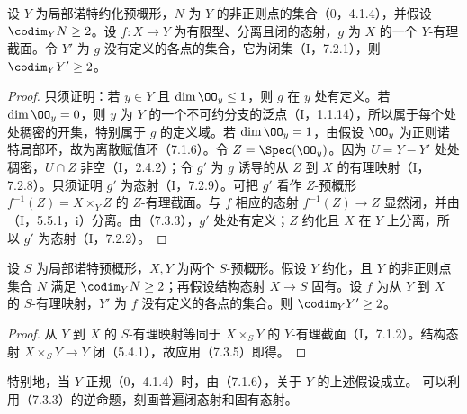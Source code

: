设 $Y$ 为局部诺特约化预概形，$N$ 为 $Y$ 的非正则点的集合（0，4.1.4），并假设 $\codim_YN\geq2$。设 $f:X\to Y$ 为有限型、分离且闭的态射，$g$ 为 $X$ 的一个 $Y$-有理截面。令 $Y'$ 为 $g$ 没有定义的各点的集合，它为闭集（I，7.2.1），则 $\codim_YY'\geq2$。
\begin{proof}
只须证明：若 $y\in Y$ 且 $\dim\OO_y\leq1$，则 $g$ 在 $y$ 处有定义。若 $\dim\OO_y=0$，则 $y$ 为 $Y$ 的一个不可约分支的泛点（I，1.1.14），所以属于每个处处稠密的开集，特别属于 $g$ 的定义域。若 $\dim\OO_y=1$，由假设 $\OO_y$ 为正则诺特局部环，故为离散赋值环（7.1.6）。令 $Z=\Spec(\OO_y)$。因为 $U=Y-Y'$ 处处稠密，$U\cap Z$ 非空（I，2.4.2）；令 $g'$ 为 $g$ 诱导的从 $Z$ 到 $X$ 的有理映射（I，7.2.8）。只须证明 $g'$ 为态射（I，7.2.9）。可把 $g'$ 看作 $Z$-预概形 $f^{-1}(Z)=X\times_Y Z$ 的 $Z$-有理截面。与 $f$ 相应的态射 $f^{-1}(Z)\to Z$ 显然闭，并由（I，5.5.1，i）分离。由（7.3.3），$g'$ 处处有定义；$Z$ 约化且 $X$ 在 $Y$ 上分离，所以 $g'$ 为态射（I，7.2.2）。
\end{proof}

设 $S$ 为局部诺特预概形，$X,Y$ 为两个 $S$-预概形。假设 $Y$ 约化，且 $Y$ 的非正则点集合 $N$ 满足 $\codim_YN\geq2$；再假设结构态射 $X\to S$ 固有。设 $f$ 为从 $Y$ 到 $X$ 的 $S$-有理映射，$Y'$ 为 $f$ 没有定义的各点的集合。则 $\codim_YY'\geq2$。
\begin{proof}
从 $Y$ 到 $X$ 的 $S$-有理映射等同于 $X\times_S Y$ 的 $Y$-有理截面（I，7.1.2）。结构态射 $X\times_S Y\to Y$ 闭（5.4.1），故应用（7.3.5）即得。
\end{proof}

特别地，当 $Y$ 正规（0，4.1.4）时，由（7.1.6），关于 $Y$ 的上述假设成立。
可以利用（7.3.3）的逆命题，刻画普遍闭态射和固有态射。


